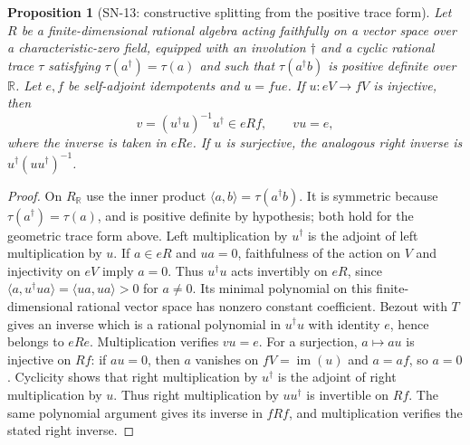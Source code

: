 \documentclass[11pt,a4paper]{article}
\newtheorem{proposition}[theorem]{Proposition}
\theoremstyle{definition}
\theoremstyle{remark}
\begin{document}
\begin{proposition}[SN-13: constructive splitting from the positive trace form]
Let $R$ be a finite-dimensional rational algebra acting faithfully on
a vector space over a characteristic-zero field, equipped with an
involution $\dagger$ and a cyclic rational trace $\tau$ satisfying
$\tau(a^\dagger)=\tau(a)$ and such that
$\tau(a^\dagger b)$ is positive definite over $\mathbb R$.
Let $e,f$ be self-adjoint idempotents
and $u=fue$.  If $u:eV\to fV$ is injective, then
\[
 v=(u^\dagger u)^{-1}u^\dagger\in eRf,
 \qquad vu=e,
\]
where the inverse is taken in $eRe$.  If $u$ is surjective, the analogous
right inverse is $u^\dagger(uu^\dagger)^{-1}$.
\end{proposition}
\begin{proof}
On $R_{\mathbb R}$ use the inner product
$\langle a,b\rangle=\tau(a^\dagger b)$.
It is symmetric because $\tau(a^\dagger)=\tau(a)$, and is positive
definite by hypothesis; both hold for the geometric trace form above.
Left multiplication by $u^\dagger$ is the adjoint of left multiplication
by $u$.  If $a\in eR$ and $ua=0$, faithfulness of the action on $V$ and
injectivity on $eV$ imply $a=0$.  Thus $u^\dagger u$ acts invertibly on
$eR$, since
$\langle a,u^\dagger ua\rangle=\langle ua,ua\rangle>0$ for $a\ne0$.
Its minimal polynomial on this finite-dimensional rational vector space
has nonzero constant coefficient.  Bezout with $T$ gives an inverse which
is a rational polynomial in $u^\dagger u$ with identity $e$, hence belongs
to $eRe$.  Multiplication verifies $vu=e$.  For a surjection,
$a\mapsto au$ is injective on $Rf$: if $au=0$, then $a$ vanishes on
$fV=\operatorname{im}(u)$ and $a=af$, so $a=0$.
Cyclicity shows that right multiplication by $u^\dagger$ is the adjoint
of right multiplication by $u$.  Thus right multiplication by
$uu^\dagger$ is invertible on $Rf$.  The same polynomial argument gives
its inverse in $fRf$, and multiplication verifies the stated right inverse.
\end{proof}
\end{document}
